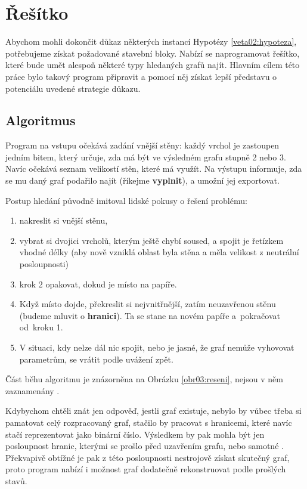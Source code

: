 
\chapter{Řešítko} \label{resitko}
Abychom mohli dokončit důkaz některých instancí Hypotézy \ref{veta02:hypoteza}, potřebujeme získat požadované stavební bloky. Nabízí se naprogramovat řešítko, které bude umět alespoň některé typy hledaných grafů najít. Hlavním cílem této práce bylo takový program připravit a pomocí něj získat lepší představu o potenciálu uvedené strategie důkazu.

\section{Algoritmus}

Program na vstupu očekává zadání vnější stěny: každý vrchol je zastoupen jedním bitem, který určuje, zda má být ve výsledném grafu stupně 2 nebo 3. Navíc očekává seznam velikostí stěn, které má využít. Na výstupu informuje, zda se mu daný graf podařilo najít (říkejme \textbf{vyplnit}), a umožní jej exportovat.

Postup hledání původně imitoval lidské pokusy o řešení problému: 

\begin{enumerate}
\item nakreslit si vnější stěnu,
\item vybrat si dvojici vrcholů, kterým ještě chybí soused, a spojit je řetízkem vhodné délky (aby nově vzniklá oblast byla stěna a měla velikost z neutrální posloupnosti)
\item krok 2 opakovat, dokud je místo na papíře.
\item Když místo dojde, překreslit si nejvnitřnější, zatím neuzavřenou stěnu (budeme mluvit o \textbf{hranici}). Ta se stane  na novém papíře a~pokračovat od~kroku 1.
\item V situaci, kdy nelze dál nic spojit, nebo je jasné, že graf nemůže vyhovovat parametrům, se vrátit podle uvážení zpět.
\end{enumerate}

Část běhu algoritmu je znázorněna na Obrázku \ref{obr03:reseni}, nejsou v něm zaznamenány .

Kdybychom chtěli znát jen  odpověď, jestli graf existuje, nebylo by vůbec třeba si pamatovat celý rozpracovaný graf, stačilo by pracovat s hranicemi, které navíc stačí reprezentovat jako binární číslo. Výsledkem by pak mohla být jen posloupnost hranic, kterými se prošlo před uzavřením grafu, nebo samotné . Překvapivě obtížné je pak z této posloupnosti nestrojově získat skutečný graf, proto program nabízí i možnost graf dodatečně rekonstruovat podle prošlých stavů.

